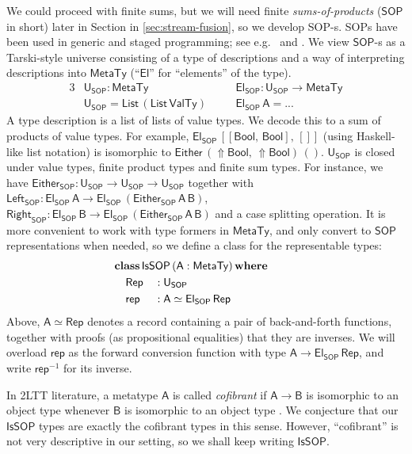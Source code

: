 \documentclass[acmsmall]{acmart}
\newcommand{\mit}[1]{{\mathsf{#1}}}
\newcommand{\msf}[1]{{\mathsf{#1}}}
\newcommand{\mbf}[1]{{\mathbf{#1}}}
\newcommand{\ind}{\hspace{1em}}
\newcommand{\where}{\mbf{where}}
\newcommand{\vA}{\mathsf{A}}
\newcommand{\vB}{\mathsf{B}}
\newcommand{\SOP}{\msf{SOP}}
\newcommand{\El}{\msf{El}}
\newcommand{\USOP}{\msf{U}_{\msf{SOP}}}
\newcommand{\IsSOP}{\msf{IsSOP}}
\newcommand{\List}{\msf{List}}
\newcommand{\Bool}{\msf{Bool}}
\newcommand{\Lift}{{\Uparrow}}
\newcommand{\MTy}{\msf{MetaTy}}
\newcommand{\VTy}{\msf{ValTy}}
\theoremstyle{remark}
\newcommand{\tyclass}{\mbf{class}}
\newcommand{\Either}{\msf{Either}}
\newcommand{\Left}{\msf{Left}}
\newcommand{\Right}{\msf{Right}}
\newcommand{\Rep}{\mit{Rep}}
\begin{document}
We could proceed with finite sums, but we will need finite
\emph{sums-of-products} ($\SOP$ in short) later in Section in
\ref{sec:stream-fusion}, so we develop SOP-s. SOPs have been used in generic and
staged programming; see e.g.\ \cite{sop} and
\cite{DBLP:conf/haskell/PickeringLW20}. We view $\SOP$-s as a Tarski-style
universe consisting of a type of descriptions and a way of interpreting
descriptions into $\MTy$ (``$\El$'' for ``elements'' of the type).
\begin{alignat*}{3}
  &\USOP : \MTy                    &&\ind \El_\SOP : \USOP \to \MTy \\
  &\USOP = \List\,(\List\,\VTy)    &&\ind \El_\SOP\,\vA = ...
\end{alignat*}
A type description is a list of lists of value types. We decode this to a sum of
products of value types. For example, $\El_\SOP\,[[\Bool,\,\Bool],\,[]]$ (using
Haskell-like list notation) is isomorphic to $\Either\,(\Lift\Bool,\,\Lift\Bool)\,()$.
$\USOP$ is closed under
value types, finite product types and finite sum types. For instance, we have
$\Either_\SOP : \USOP \to \USOP \to \USOP$ together with $\Left_\SOP : \El_\SOP\,\vA
\to \El_\SOP\,(\Either_\SOP\,\vA\,\vB)$, $\Right_\SOP : \El_\SOP\,\vB \to
\El_\SOP\,(\Either_\SOP\,\vA\,\vB)$ and a case splitting operation. It is more
convenient to work with type formers in $\MTy$, and only convert to $\SOP$
representations when needed, so we define a class for the representable types:
\begin{alignat*}{3}
  & \hspace{-5em}\mathrlap{\tyclass\,\IsSOP\,(\vA : \MTy)\,\where} \\
  & \hspace{-5em}\ind \Rep      &&: \USOP \\
  & \hspace{-5em}\ind \mit{rep} &&: \vA \simeq \El_\SOP\,\Rep
\end{alignat*}
Above, $\vA \simeq \Rep$ denotes a record containing a pair of back-and-forth
functions, together with proofs (as propositional equalities) that they are
inverses. We will overload $\mit{rep}$ as the forward conversion function with
type $\vA \to \El_\SOP\,\Rep$, and write $\mit{rep}^{-1}$ for its inverse.

In 2LTT literature, a metatype $\vA$ is called \emph{cofibrant} if $\vA \to \vB$ is
isomorphic to an object type whenever $\vB$ is isomorphic to an object type
\cite{twolevel}. We conjecture that our $\IsSOP$ types are exactly the cofibrant
types in this sense. However, ``cofibrant'' is not very descriptive in our
setting, so we shall keep writing $\IsSOP$.
\end{document}
